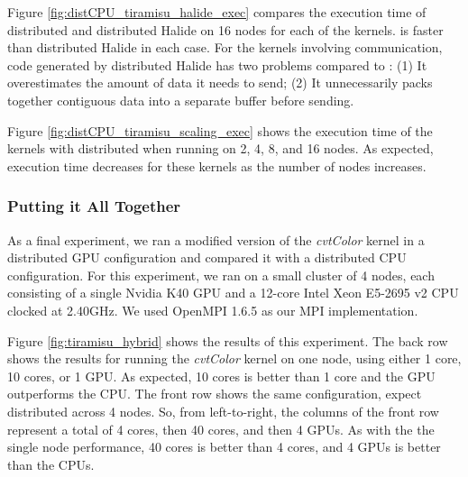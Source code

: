 Figure \ref{fig:distCPU_tiramisu_halide_exec} compares the execution time of distributed \framework{} and distributed Halide on 16 nodes for each of the kernels. \framework{} is faster than distributed Halide in each case. For the kernels involving communication, code generated by distributed Halide has two problems compared to \framework{}: (1) It overestimates the amount of data it needs to send; (2) It unnecessarily packs together contiguous data into a separate buffer before sending.


Figure \ref{fig:distCPU_tiramisu_scaling_exec} shows the execution time of the kernels with distributed \framework{} when running on 2, 4, 8, and 16 nodes. As expected, execution time decreases for these kernels as the number of nodes increases.

\subsubsection{Putting it All Together}
As a final experiment, we ran a modified version of the \emph{cvtColor} kernel in a distributed GPU configuration and compared it with a distributed CPU configuration. For this experiment, we ran on a small cluster of 4 nodes, each consisting of a single Nvidia K40 GPU and a 12-core Intel Xeon E5-2695 v2 CPU clocked at 2.40GHz. We used OpenMPI 1.6.5 \cite{openmpi} as our MPI implementation.

Figure \ref{fig:tiramisu_hybrid} shows the results of this experiment. The back row shows the results for running the \emph{cvtColor} kernel on one node, using either 1 core, 10 cores, or 1 GPU. As expected, 10 cores is better than 1 core and the GPU outperforms the CPU. The front row shows the same configuration, expect distributed across 4 nodes. So, from left-to-right, the columns of the front row represent a total of 4 cores, then 40 cores, and then 4 GPUs. As with the the single node performance, 40 cores is better than 4 cores, and 4 GPUs is better than the CPUs. 


